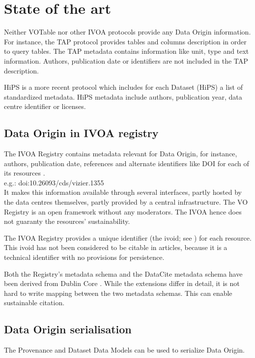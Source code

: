 \documentclass[11pt,a4paper]{ivoa}
\begin{document}
\section{State of the art}

Neither VOTable \citep{2019ivoa.spec.1021O} nor other IVOA protocols provide any Data Origin information. For instance, the TAP protocol \citep{2019ivoa.spec.0927D} provides tables and columns description in order to query tables. The TAP metadata contains information like unit, type and text information. Authors, publication date or identifiers are not included in the TAP description.

HiPS \citep{2017ivoa.spec.0519F} is a more recent protocol which includes for each Dataset (HiPS) a list of standardized metadata. HiPS metadata include authors, publication year, data centre identifier or licenses.


\subsection{Data Origin in IVOA registry}
The IVOA Registry contains metadata relevant for Data Origin, for instance, authors, publication date, references and alternate identifiers like DOI for each of its resources \citep{2018ivoa.spec.0625P}.\\

e.g.: doi:10.26093/cds/vizier.1355 \\

It makes this information available through several interfaces, partly
hosted by the data centres themselves, partly provided by a central
infrastructure.
The VO Registry is an open framework without any moderators.
The IVOA hence does not guaranty the resources' sustainability.

The IVOA Registry provides a unique identifier (the ivoid; see \citet{2016ivoa.spec.0523D}) for each resource.  This ivoid has not been considered to be citable in articles, because it is a technical identifier with no provisions for persistence.

Both the Registry's metadata schema and the DataCite
\citep{std:datacite} metadata schema have been
derived from Dublin Core \citep{std:dublincore}.  While the extensions differ in detail, it is not
hard to write mapping between the two metadata schemas.  This can enable
sustainable citation.

\subsection{Data Origin serialisation}
The Provenance \citep{2020ivoa.spec.0411S} and Dataset Data Models can be used to serialize Data Origin.
\end{document}

